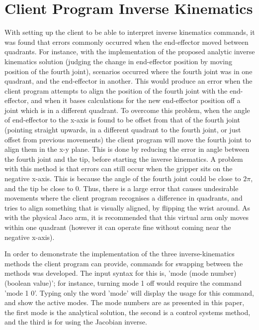 \documentclass[12pt,openany,a4paper]{book}
\begin{document}
\section{Client Program Inverse Kinematics}
With setting up the client to be able to interpret inverse kinematics commands, it was found that errors commonly occurred when the end-effector moved between quadrants.  For instance, with the implementation of the proposed analytic inverse kinematics solution (judging the change in end-effector position by moving position of the fourth joint), scenarios occurred where the fourth joint was in one quadrant, and the end-effector in another. This would produce an error when the client program attempts to align the position of the fourth joint with the end-effector, and when it bases calculations for the new end-effector position off a joint which is in a different quadrant. To overcome this problem, when the angle of end-effector to the x-axis is found to be offset from that of the fourth joint (pointing straight upwards, in a different quadrant to the fourth joint, or just offset from previous movements) the client program will move the fourth joint to align them in the x-y plane. This is done by reducing the error in angle between the fourth joint and the tip, before starting the inverse kinematics. A problem with this method is that errors can still occur when the gripper sits on the negative x-axis. This is because the angle of the fourth joint could be close to $2 \pi$, and the tip be close to 0. Thus, there is a large error that causes undesirable movements where the client program recognises a difference in quadrants, and tries to align something that is visually aligned, by flipping the wrist around. As with the physical Jaco arm, it is recommended that this virtual arm only moves within one quadrant (however it can operate fine without coming near the negative x-axis).


In order to demonstrate the implementation of the three inverse-kinematics methods the client program can provide, commands for swapping between the methods was developed. The input syntax for this is, 'mode (mode number) (boolean value)'; for instance, turning mode 1 off would require the command 'mode 1 0'. Typing only the word 'mode' will display the usage for this command, and show the active modes. The mode numbers are as presented in this paper, the first mode is the analytical solution, the second is a control systems method, and the third is for using the Jacobian inverse.
\end{document}
